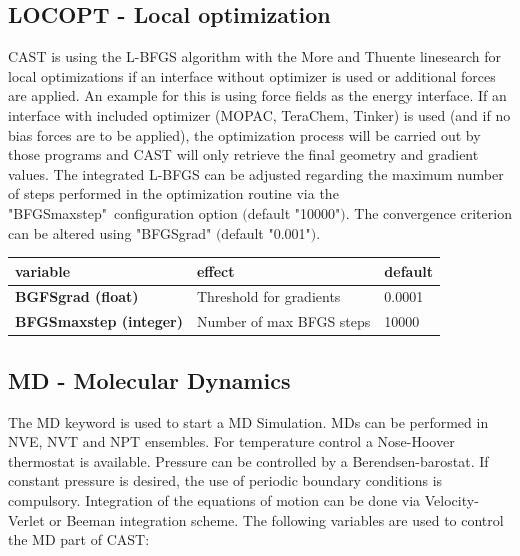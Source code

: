 \documentclass[10pt,a4paper]{article} %
\newif\ifdevmode %
\begin{document}
	\subsection{LOCOPT - Local optimization}
	\label{sec:locopt}
	\ac{CAST} is using the L-BFGS algorithm\supercite{bfgs} with the More and Thuente linesearch\supercite{morethuente} for local optimizations if an interface without optimizer is used or additional forces are applied. An example for this is using force fields as the energy interface. \ifdevmode ~\\ \colorbox{red}{what does additional forces applied mean?} ~\\ \fi
	If an interface with included optimizer (MOPAC, TeraChem, Tinker) is used (and if no bias forces are to be applied), the optimization process will be carried out by those programs and \ac{CAST} will only retrieve the final geometry and gradient values.
	The integrated L-BFGS can be adjusted regarding the maximum number of steps performed in the optimization routine via the "BFGSmaxstep"\ configuration option $($default "10000"$)$.
	The convergence criterion can be altered using "BFGSgrad" $($default "0.001"$)$.

	\begin{tabularx}{\textwidth}{l|l|l}
		variable & effect & default \\
		\hline
		\textbf{BGFSgrad (float)} & Threshold for gradients & 0.0001 \\
		\textbf{BFGSmaxstep (integer)} & Number of max BFGS steps & 10000 \\
	\end{tabularx}

	\subsection{MD - Molecular Dynamics}
	The MD keyword is used to start a \acf{MD} Simulation\supercite{md_art}. \acp{MD} can be performed in NVE, NVT and NPT ensembles. For temperature control a Nose-Hoover thermostat\supercite{nose,hoover} is available. Pressure can be controlled by a Berendsen-barostat\supercite{berendsen}. If constant pressure is desired, the use of periodic boundary conditions is compulsory. Integration of the equations of motion can be done via Velocity-Verlet or Beeman\supercite{beeman} integration scheme.
	The following variables are used to control the \ac{MD} part of \ac{CAST}:\\~\\
\end{document}
